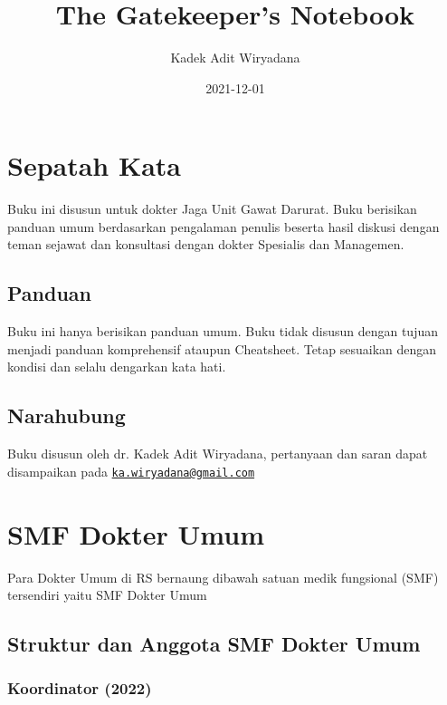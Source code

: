 \documentclass[
]{book}
\title{The Gatekeeper's Notebook}
\author{Kadek Adit Wiryadana}
\date{2021-12-01}
\begin{document}
\maketitle

{
\setcounter{tocdepth}{1}
\tableofcontents
}
\hypertarget{sepatah-kata}{%
\chapter{Sepatah Kata}\label{sepatah-kata}}

Buku ini disusun untuk dokter Jaga Unit Gawat Darurat. Buku berisikan panduan umum berdasarkan pengalaman penulis beserta hasil diskusi dengan teman sejawat dan konsultasi dengan dokter Spesialis dan Managemen.

\hypertarget{panduan}{%
\section{Panduan}\label{panduan}}

Buku ini hanya berisikan panduan umum. Buku tidak disusun dengan tujuan menjadi panduan komprehensif ataupun Cheatsheet. Tetap sesuaikan dengan kondisi dan selalu dengarkan kata hati.

\hypertarget{narahubung}{%
\section{Narahubung}\label{narahubung}}

Buku disusun oleh dr. Kadek Adit Wiryadana, pertanyaan dan saran dapat disampaikan pada \href{mailto:ka.wiryadana@gmail.com}{\nolinkurl{ka.wiryadana@gmail.com}}

\hypertarget{smf-dokter-umum}{%
\chapter{SMF Dokter Umum}\label{smf-dokter-umum}}

Para Dokter Umum di RS bernaung dibawah satuan medik fungsional (SMF) tersendiri yaitu SMF Dokter Umum

\hypertarget{struktur-dan-anggota-smf-dokter-umum}{%
\section{Struktur dan Anggota SMF Dokter Umum}\label{struktur-dan-anggota-smf-dokter-umum}}

\hypertarget{koordinator-2022}{%
\subsection{Koordinator (2022)}\label{koordinator-2022}}
\end{document}

